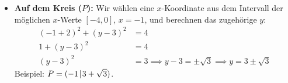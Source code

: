 \documentclass[ngerman]{scrreprt}
\newenvironment{loesungbox}[1]
  {\needspace{5\baselineskip}\begin{loesungboxstyle}[frametitle={#1}]}
  {\end{loesungboxstyle}}
\begin{document}
\begin{loesungbox}{Lösung zu \Cref{aufg:kreisgleichung}}
\begin{enumerate}
\begin{itemize}
        \item \textbf{Auf dem Kreis ($P$):} Wir wählen eine $x$-Koordinate aus dem Intervall der möglichen $x$-Werte $[-4, 0]$, \zB $x=-1$, und berechnen das zugehörige $y$:
        \begin{align*}
            {(-1+2)}^2 + {(y-3)}^2 &= 4 \\
            1 + {(y-3)}^2 &= 4 \\
            {(y-3)}^2 &= 3 \implies y-3 = \pm\sqrt{3} \implies y = 3 \pm \sqrt{3}
        \end{align*}
        Beispiel: $P = (-1\!\mid\! 3+\sqrt{3})$.
    \end{itemize}
\end{enumerate}
\end{loesungbox}
\end{document}
